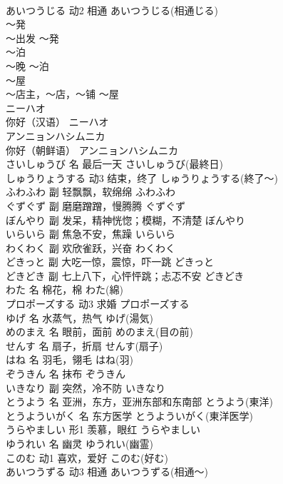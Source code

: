 \documentclass[8pt]{extreport}
\begin{document}
\begin{CJK}{UTF8}{min}
\\	あいつうじる	动2	相通	あいつうじる(相通じる)	
\\	～発	
\\	～出发	～発	
\\	～泊	
\\	～晚	～泊	
\\	～屋	
\\	～店主，～店，～铺	～屋	
\\	ニーハオ	
\\	你好（汉语）	ニーハオ	
\\	アンニョンハシムニカ	
\\	你好（朝鲜语）	アンニョンハシムニカ	
\\	さいしゅうび	名	最后一天	さいしゅうび(最終日)	
\\	しゅうりょうする	动3	结束，终了	しゅうりょうする(終了～)	
\\	ふわふわ	副	轻飘飘，软绵绵	ふわふわ	
\\	ぐずぐず	副	磨磨蹭蹭，慢腾腾	ぐずぐず	
\\	ぼんやり	副	发呆，精神恍惚；模糊，不清楚	ぼんやり	
\\	いらいら	副	焦急不安，焦躁	いらいら	
\\	わくわく	副	欢欣雀跃，兴奋	わくわく	
\\	どきっと	副	大吃一惊，震惊，吓一跳	どきっと	
\\	どきどき	副	七上八下，心怦怦跳；忐忑不安	どきどき	
\\	わた	名	棉花，棉	わた(綿)	
\\	プロポーズする	动3	求婚	プロポーズする	
\\	ゆげ	名	水蒸气，热气	ゆげ(湯気)	
\\	めのまえ	名	眼前，面前	めのまえ(目の前)	
\\	せんす	名	扇子，折扇	せんす(扇子)	
\\	はね	名	羽毛，翎毛	はね(羽)	
\\	ぞうきん	名	抹布	ぞうきん	
\\	いきなり	副	突然，冷不防	いきなり	
\\	とうよう	名	亚洲，东方，亚洲东部和东南部	とうよう(東洋)	
\\	とうよういがく	名	东方医学	とうよういがく(東洋医学)	
\\	うらやましい	形1	羡慕，眼红	うらやましい	
\\	ゆうれい	名	幽灵	ゆうれい(幽霊)	
\\	このむ	动1	喜欢，爱好	このむ(好む)	
\\	あいつうずる	动3	相通	あいつうずる(相通～)	

\end{CJK}
\end{document}
